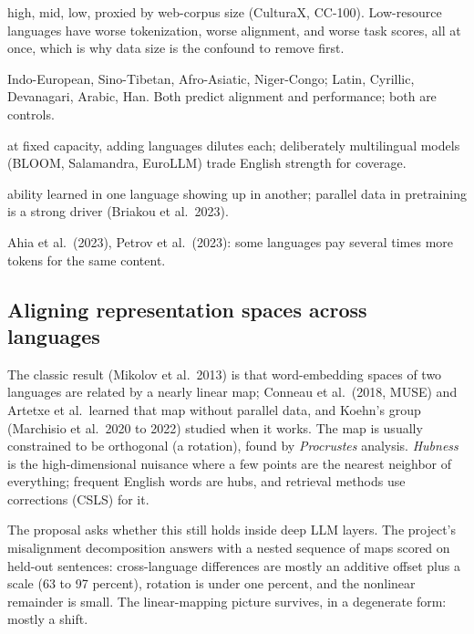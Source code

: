 \begin{description}[leftmargin=3.0cm, style=nextline, itemsep=1pt]
\item[resource tiers] high, mid, low, proxied by web-corpus size (CulturaX, CC-100). Low-resource languages have worse tokenization, worse alignment, and worse task scores, all at once, which is why data size is the confound to remove first.
\item[families and scripts] Indo-European, Sino-Tibetan, Afro-Asiatic, Niger-Congo; Latin, Cyrillic, Devanagari, Arabic, Han. Both predict alignment and performance; both are controls.
\item[curse of multilinguality] at fixed capacity, adding languages dilutes each; deliberately multilingual models (BLOOM, Salamandra, EuroLLM) trade English strength for coverage.
\item[cross-lingual transfer] ability learned in one language showing up in another; parallel data in pretraining is a strong driver (Briakou et al.\ 2023).
\item[tokenizer fairness] Ahia et al.\ (2023), Petrov et al.\ (2023): some languages pay several times more tokens for the same content.
\end{description}

\subsection{Aligning representation spaces across languages}

The classic result (Mikolov et al.\ 2013) is that word-embedding spaces of two
languages are related by a nearly linear map; Conneau et al.\ (2018, MUSE) and
Artetxe et al.\ learned that map without parallel data, and Koehn's group
(Marchisio et al.\ 2020 to 2022) studied when it works. The map is usually
constrained to be orthogonal (a rotation), found by \emph{Procrustes}
analysis. \emph{Hubness} is the high-dimensional nuisance where a few points
are the nearest neighbor of everything; frequent English words are hubs, and
retrieval methods use corrections (CSLS) for it.

The proposal asks whether this still holds inside deep LLM layers. The
project's misalignment decomposition answers with a nested sequence of maps scored on
held-out sentences: cross-language differences are mostly an additive offset
plus a scale (63 to 97 percent), rotation is under one percent, and the
nonlinear remainder is small. The linear-mapping picture survives, in a
degenerate form: mostly a shift.

